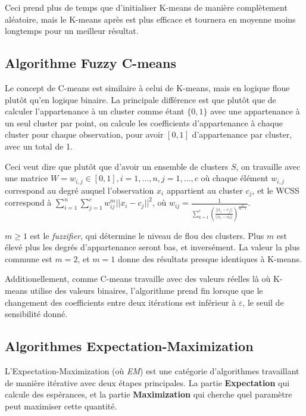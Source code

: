 \documentclass{article}
\begin{document}
        Ceci prend plus de temps que d'initialiser K-means de manière complètement aléatoire, mais le K-means après est plus efficace et tournera en moyenne moins longtemps pour un meilleur résultat.

    \subsection{Algorithme Fuzzy C-means}

      Le concept de C-means est similaire à celui de K-means, mais en logique floue plutôt qu'en logique binaire. La principale différence est que plutôt que de calculer l'appartenance à un cluster comme étant $\{0,1\}$ avec une appartenance à un seul cluster par point, on calcule les coefficients d'appartenance à chaque cluster pour chaque observation, pour avoir $[0,1]$ d'appartenance par cluster, avec un total de 1.

      Ceci veut dire que plutôt que d'avoir un ensemble de clusters $S$, on travaille avec une matrice $W=w_{i,j}\in [0,1], i=1,...,n, j=1,...,c$ où chaque élément $w_{i,j}$ correspond au degré auquel l'observation $x_i$ appartient au cluster $c_j$, et le WCSS correspond à $\sum_{i=1}^n\sum_{j=1}^c w_{ij}^m ||x_i-c_j||^2$, où $w_{ij} = \frac{1}{\sum_{k=1}^c (\frac{||x_i-c_j||}{||x_i-c_k||}) ^{\frac{2}{m-1}}}$.

      $m \geq 1$ est le \textit{fuzzifier}, qui détermine le niveau de flou des clusters. Plus $m$ est élevé plus les degrés d'appartenance seront bas, et inversément. La valeur la plus commune est $m=2$, et $m=1$ donne des résultats presque identiques à K-means.

      Additionellement, comme C-means travaille avec des valeurs réelles là où K-means utilise des valeurs binaires, l'algorithme prend fin lorsque que le changement des coefficients entre deux itérations est inférieur à $\varepsilon$, le seuil de sensibilité donné.

    \subsection{Algorithmes Expectation-Maximization}

      L'Expectation-Maximization (où \textit{EM}) est une catégorie d'algorithmes travaillant de manière itérative avec deux étapes principales. La partie \textbf{Expectation} qui calcule des espérances, et la partie \textbf{Maximization} qui cherche quel paramètre peut maximiser cette quantité.
\end{document}
